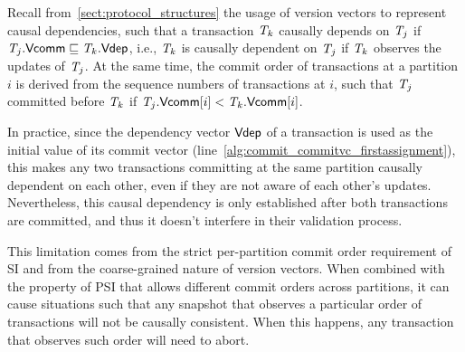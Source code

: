 Recall from~\ref{sect:protocol_structures} the usage of version vectors to represent causal dependencies, such that a transaction $\mathit{T}_k$ causally depends on $\mathit{T}_j$ if $\mathit{T}_j.\mathsf{Vcomm} \sqsubseteq \mathit{T}_k.\mathsf{Vdep}$, i.e., $\mathit{T}_k$ is causally dependent on $\mathit{T}_j$ if $\mathit{T}_k$ observes the updates of $\mathit{T}_j$. At the same time, the commit order of transactions at a partition $i$ is derived from the sequence numbers of transactions at $i$, such that $\mathit{T}_j$ committed before $\mathit{T}_k$ if $\mathit{T}_j.\mathsf{Vcomm}[i] < \mathit{T}_k.\mathsf{Vcomm}[i]$.

In practice, since the dependency vector $\mathsf{Vdep}$ of a transaction is used as the initial value of its commit vector (line~\ref{alg:commit_commitvc_firstassignment}), this makes any two transactions committing at the same partition causally dependent on each other, even if they are not aware of each other's updates. Nevertheless, this causal dependency is only established after both transactions are committed, and thus it doesn't interfere in their validation process.


This limitation comes from the strict per-partition commit order requirement of SI and from the coarse-grained nature of version vectors. When combined with the property of PSI that allows different commit orders across partitions, it can cause situations such that any snapshot that observes a particular order of transactions will not be causally consistent. When this happens, any transaction that observes such order will need to abort.

